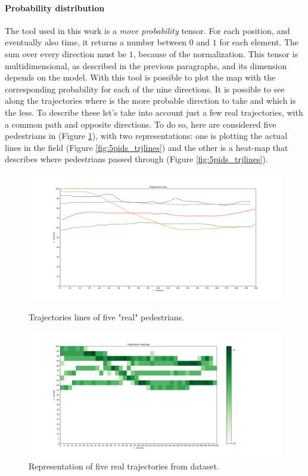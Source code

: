 \documentclass[class=article, crop=false]{standalone}
\begin{document}
\paragraph{Probability distribution}
The tool used in this work is a \emph{move probability} tensor.
For each position, and eventually also time, it returns a number between $0$ and $1$ for each element.
The sum over every direction must be $1$, because of the normalization.
This tensor is multidimensional, as described in the previous paragraphs, and its dimension depends on the model.
With this tool is possible to plot the map with the corresponding probability for each of the nine directions.
It is possible to see along the trajectories where is the more probable direction to take and which is the less.
To describe these let's take into account just a few real trajectories, with a common path and opposite directions.
To do so, here are considered five pedestrians in (Figure \ref{fig:5pids_trjl}), with two representations:
one is plotting the actual lines in the field (Figure \ref{fig:5pids_trjlines}) and the other is a heat-map that describes where pedestrians passed through (Figure \ref{fig:5pids_trjlines}).
\begin{figure}[ht]
\begin{minipage}[c]{0.5\linewidth}
\centering
\includegraphics[scale=0.17]{fig/5pids/figure_trainf10_few_trajectories_Dx200_Dy100_TRJLINES}
\captionsetup{width=.8\linewidth}
\caption{Trajectories lines of five "real" pedestrians.}
\label{fig:5pids_trjlines}
\end{minipage}
\begin{minipage}[c]{0.5\linewidth}
\centering
\includegraphics[scale=0.17]{fig/5pids/figure_trainf10_few_trajectories_Dx200_Dy100_TRJHIST}
\captionsetup{width=.8\linewidth}
\caption{Representation of five real trajectories from dataset.}
\label{fig:5pids_trjl}
\end{minipage}
\end{figure}
\end{document}
